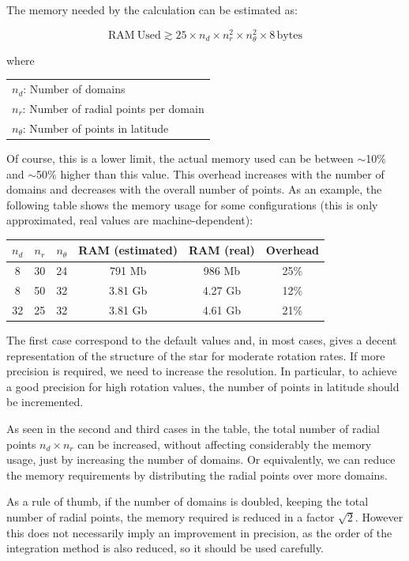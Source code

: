 The memory needed by the calculation can be estimated as:

$$\mathrm{RAM\ Used}\gtrsim25\times n_d\times n_r^2 \times n_\theta^2 \times 8\, \mathrm{bytes}$$

where

\medskip

\begin{tabular}{l}
$n_d$: Number of domains \\
$n_r$: Number of radial points per domain \\
$n_\theta$: Number of points in latitude \\
\end{tabular}

\medskip

Of course, this is a lower limit, the actual memory used can be between $\sim$10\% and $\sim$50\% higher than
this value.
This overhead increases with the number of domains and decreases with the overall number
of points. As an example, the following table shows the memory usage for some configurations (this is
only approximated, real values are machine-dependent):

\begin{center}
\begin{tabular}{c|c|c|c|c|c}
$n_d$&$n_r$&$n_\theta$&RAM (estimated)&RAM (real)&Overhead\\
\hline
8&30&24& 791 Mb & 986 Mb & 25\% \\
8&50&32& 3.81 Gb & 4.27 Gb & 12\% \\
32&25&32& 3.81 Gb & 4.61 Gb & 21\% \\
\end{tabular}
\end{center}

The first case correspond to the default values and, in most cases, 
gives a decent representation of the structure of the star for moderate rotation rates.
If more precision is required, we need to increase the resolution. In particular, to
achieve a good precision for high rotation values, the number of points in latitude should
be incremented. 

As seen in the second and third cases in the table, the total number of radial points $n_d\times n_r$ can be 
increased, without affecting considerably the memory usage, just by increasing the number of domains.
Or equivalently, we can reduce the memory requirements by distributing the radial points over
more domains. 

As a rule of thumb, if the number of domains is doubled, keeping the total number of
radial points, the memory required is reduced in a factor $\sqrt{2}$. However this does not
necessarily imply an improvement in precision, as the order of the integration method is also reduced,
so it should be used carefully.

